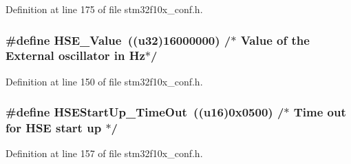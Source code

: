 Definition at line 175 of file stm32f10x\+\_\+conf.\+h.

\subsubsection[{\texorpdfstring{H\+S\+E\+\_\+\+Value}{HSE_Value}}]{\setlength{\rightskip}{0pt plus 5cm}\#define H\+S\+E\+\_\+\+Value~(({\bf u32})16000000) /$\ast$ Value of the External oscillator in Hz$\ast$/}\hypertarget{bsp_2boards_2iot-lab___a8-_m3_2configure_2stm32f10x__conf_8h_ab12a1abe6dd0001e7a0487a8b175b28c}{}\label{bsp_2boards_2iot-lab___a8-_m3_2configure_2stm32f10x__conf_8h_ab12a1abe6dd0001e7a0487a8b175b28c}


Definition at line 150 of file stm32f10x\+\_\+conf.\+h.

\subsubsection[{\texorpdfstring{H\+S\+E\+Start\+Up\+\_\+\+Time\+Out}{HSEStartUp_TimeOut}}]{\setlength{\rightskip}{0pt plus 5cm}\#define H\+S\+E\+Start\+Up\+\_\+\+Time\+Out~(({\bf u16})0x0500) /$\ast$ Time out for H\+S\+E start up $\ast$/}\hypertarget{bsp_2boards_2iot-lab___a8-_m3_2configure_2stm32f10x__conf_8h_a7e69dacd5c3b950b5b1786d7336b30d3}{}\label{bsp_2boards_2iot-lab___a8-_m3_2configure_2stm32f10x__conf_8h_a7e69dacd5c3b950b5b1786d7336b30d3}


Definition at line 157 of file stm32f10x\+\_\+conf.\+h.

